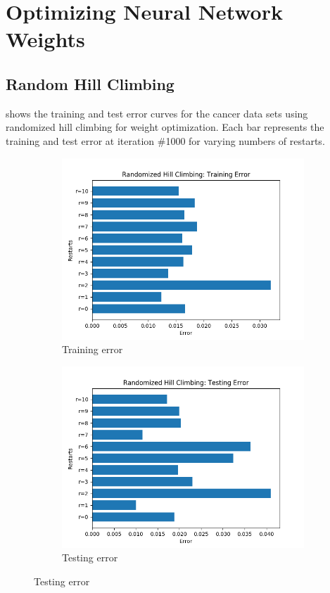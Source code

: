 \documentclass{article}
\begin{document}
  \section{Optimizing Neural Network Weights}

  \subsection{Random Hill Climbing}

   shows the training and test error curves for the cancer data sets using randomized hill climbing for weight optimization. Each bar represents the training and test error at iteration \#1000 for varying numbers of restarts.

  \begin{figure}[htb]
  \centering

  \begin{subfigure}{0.5\textwidth}
    \includegraphics[width=\linewidth]{out/rhc/restarts-training.png}
    \caption{Training error}
    \label{fig:rhc-params-1}
  \end{subfigure}\hfil
  \begin{subfigure}{0.5\textwidth}
    \includegraphics[width=\linewidth]{out/rhc/restarts-testing.png}
    \caption{Testing error}
    \label{fig:rhc-params-2}
  \end{subfigure}


\end{figure}
\end{document}
